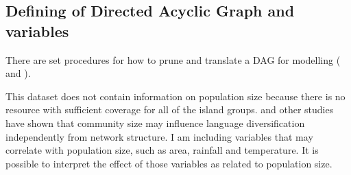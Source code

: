 \documentclass[a4paper,10pt]{article} %
\begin{document}
\newpage
\subsection{Defining of Directed Acyclic Graph and variables}
\label{appendix_DAG_def}

 There are set procedures for how to prune and translate a DAG for modelling (\citet{pearl1995causal} and \citet{mcelreath2020statistical}). 

This dataset does not contain information on population size because there is no resource with sufficient coverage for all of the island groups. \citet{raviv2019larger} and other studies have shown that community size may influence language diversification independently from network structure. I am including variables that may correlate with population size, such as area, rainfall and temperature. It is possible to interpret the effect of those variables as related to population size.



\end{document}
